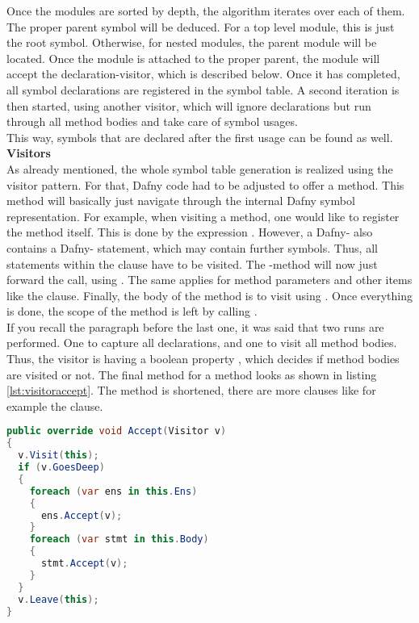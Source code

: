 Once the modules are sorted by depth, the algorithm iterates over each of them.
The proper parent symbol will be deduced.
For a top level module, this is just the root symbol.
Otherwise, for nested modules, the parent module will be located.
Once the module is attached to the proper parent, the module will accept the declaration-visitor, which is described below.
Once it has completed, all symbol declarations are registered in the symbol table.
A second iteration is then started, using another visitor, which will ignore declarations but run through all method bodies
and take care of symbol usages.\\
This way, symbols that are declared after the first usage can be found as well.\\

\textbf{Visitors}\\
As already mentioned, the whole symbol table generation is realized using the visitor pattern.
For that, Dafny code had to be adjusted to offer a  method.
This method will basically just navigate through the internal Dafny symbol representation.
For example, when visiting a method, one would like to register the method itself.
This is done by the expression .
However, a Dafny- also contains a Dafny- statement, which may contain further symbols.
Thus, all statements within the  clause have to be visited.
The -method will now just forward the call, using .
The same applies for method parameters and other items like the  clause.
Finally, the body of the method is to visit using .
Once everything is done, the scope of the method is left by calling .\\

If you recall the paragraph before the last one, it was said that two runs are performed.
One to capture all declarations, and one to visit all method bodies.
Thus, the visitor is having a boolean property , which decides if method bodies are visited or not.
The final  method for a method looks as shown in listing \ref{lst:visitoraccept}.
The method is shortened, there are more clauses like for example the  clause.


\begin{lstlisting}[language=csharp, caption={Accepting a Visitor}, captionpos=b, label={lst:visitoraccept}]
public override void Accept(Visitor v)
{
  v.Visit(this);
  if (v.GoesDeep)
  {
    foreach (var ens in this.Ens)
    {
      ens.Accept(v);
    }
    foreach (var stmt in this.Body)
    {
      stmt.Accept(v);
    }
  }
  v.Leave(this);
}
\end{lstlisting}

